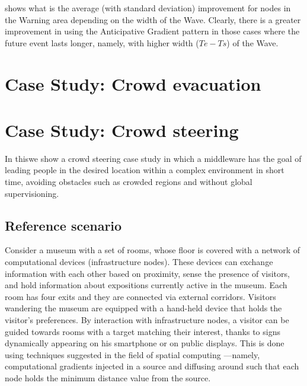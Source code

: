 \documentclass[12pt,a4paper,twoside,openright]{book}
\begin{document}
 shows what is the average (with standard deviation) improvement for nodes in the Warning area depending on the width of the Wave. Clearly, there is a greater improvement in using the Anticipative Gradient pattern in those cases where the future event lasts longer, namely, with higher width ($Te-Ts$) of the Wave.





















\chapter{Case Study: Crowd evacuation}
\chapter{Case Study: Crowd steering}
\label{jos-museum}
In this\levelText{}we show a crowd steering case study in which a middleware has the goal of leading people in the desired location within a complex environment in short time, avoiding obstacles such as crowded regions and without global supervisioning. 

\section{Reference scenario}

Consider a museum with a  set of rooms, whose floor is covered with a network of computational devices (infrastructure nodes).
%
These devices can exchange information with each other based on proximity, sense the presence of visitors, and hold information about expositions currently active in the museum.
%
Each room has four exits and they are connected via external corridors. Visitors wandering the museum are equipped with a hand-held device that holds the visitor's preferences.
%
By interaction with infrastructure nodes, a visitor can be guided towards rooms with a target matching their interest, thanks to signs dynamically appearing on his smartphone or on public displays.
%
This is done using techniques suggested in the field of spatial computing \cite{VCMZ-TAAS2011}---namely, computational gradients injected in a source and diffusing around such that each node holds the minimum distance value from the source.
\end{document}
